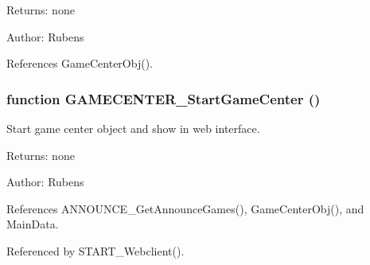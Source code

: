 \begin{Desc}
\item[Returns:]none \end{Desc}
\begin{Desc}
\item[Author:]Rubens \end{Desc}


References GameCenterObj().
\subsubsection[GAMECENTER\_\-StartGameCenter]{\setlength{\rightskip}{0pt plus 5cm}function GAMECENTER\_\-StartGameCenter ()}\label{gamecenter_2gamecenter_8js_49b9357e47b94dfecd43a5e54254f209}


Start game center object and show in web interface. 

\begin{Desc}
\item[Returns:]none \end{Desc}
\begin{Desc}
\item[Author:]Rubens \end{Desc}


References ANNOUNCE\_\-GetAnnounceGames(), GameCenterObj(), and MainData.

Referenced by START\_\-Webclient().